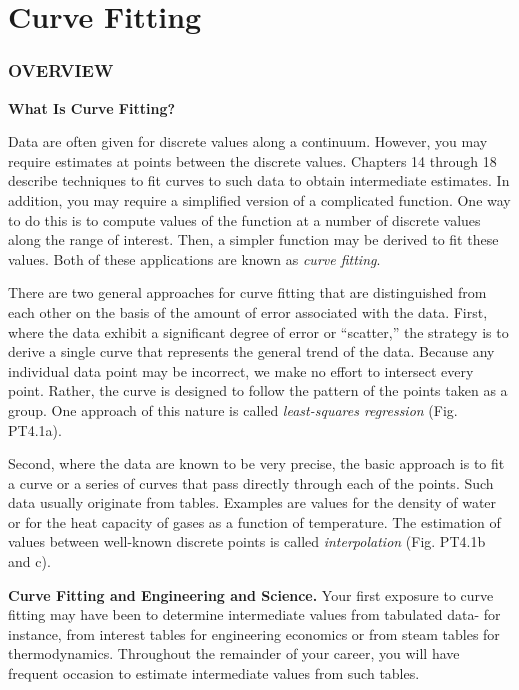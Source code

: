 \documentclass[../main.tex]{subfiles}
\begin{document}
\part{Curve Fitting}

\section{OVERVIEW}

\noindent \textbf{What Is Curve Fitting?}

\noindent Data are often given for discrete values along a continuum. However, you may require estimates at points between the discrete values. Chapters 14 through 18 describe techniques to
fit curves to such data to obtain intermediate estimates. In addition, you may require a simplified version of a complicated function. One way to do this is to compute values of the
function at a number of discrete values along the range of interest. Then, a simpler function
may be derived to fit these values. Both of these applications are known as \textit{curve fitting}.

There are two general approaches for curve fitting that are distinguished from each
other on the basis of the amount of error associated with the data. First, where the data
exhibit a significant degree of error or ``scatter,'' the strategy is to derive a single curve that
represents the general trend of the data. Because any individual data point may be incorrect, we make no effort to intersect every point. Rather, the curve is designed to follow the
pattern of the points taken as a group. One approach of this nature is called \textit{least-squares
regression} (Fig. PT4.1a).

Second, where the data are known to be very precise, the basic approach is to fit a
curve or a series of curves that pass directly through each of the points. Such
data usually originate from tables. Examples are values for the density of water
or for the heat capacity of gases as a
function of temperature. The estimation
of values between well-known discrete
points is called \textit{interpolation} (Fig.
PT4.1b and c).

\noindent \textbf{Curve Fitting and Engineering and
Science. }  Your first exposure to curve
fitting may have been to determine intermediate values from tabulated data- for instance, from interest tables for
engineering economics or from steam tables for thermodynamics. Throughout the remainder of your career, you will have frequent occasion to estimate intermediate values from such tables.
\end{document}
